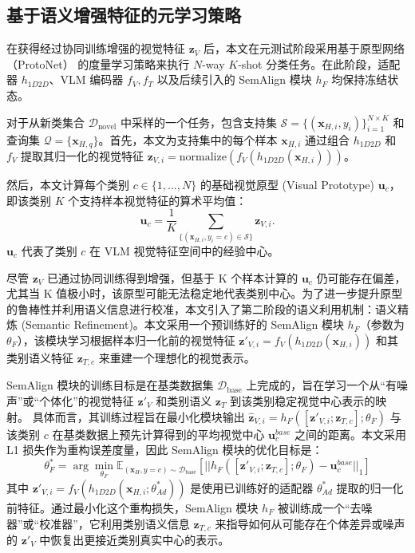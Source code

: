 \subsection{基于语义增强特征的元学习策略}
\label{subsec:semantic_fsl_strategy}

在获得经过协同训练增强的视觉特征 $\mathbf{z}_V$ 后，本文在元测试阶段采用基于原型网络（ProtoNet） 的度量学习策略来执行 $N$-way $K$-shot 分类任务。在此阶段，适配器 $h_{1D2D}$、VLM 编码器 $f_V, f_T$ 以及后续引入的 SemAlign 模块 $h_F$ 均保持冻结状态。

对于从新类集合 $\mathcal{D}_{\text{novel}}$ 中采样的一个任务，包含支持集 $\mathcal{S} = \{(\mathbf{x}_{H,i}, y_i)\}_{i=1}^{N \times K}$ 和查询集 $\mathcal{Q} = \{\mathbf{x}_{H,q}\}$。首先，本文为支持集中的每个样本 $\mathbf{x}_{H,i}$ 通过组合 $h_{1D2D}$ 和 $f_V$ 提取其归一化的视觉特征 $\mathbf{z}_{V,i} = \text{normalize}(f_V(h_{1D2D}(\mathbf{x}_{H,i})))$。

然后，本文计算每个类别 $c \in \{1, \dots, N\}$ 的基础视觉原型 (Visual Prototype) $\mathbf{u}_c$，即该类别 $K$ 个支持样本视觉特征的算术平均值：
\begin{equation} \mathbf{u}_c = \frac{1}{K} \sum_{\{(\mathbf{x}_{H,i}, y_i=c) \in \mathcal{S}\}} \mathbf{z}_{V,i}. \label{eq:visual_prototype} \end{equation}
$\mathbf{u}_c$ 代表了类别 $c$ 在 VLM 视觉特征空间中的经验中心。

尽管 $\mathbf{z}_V$ 已通过协同训练得到增强，但基于 K 个样本计算的 $\mathbf{u}_c$ 仍可能存在偏差，尤其当 K 值极小时，该原型可能无法稳定地代表类别中心。为了进一步提升原型的鲁棒性并利用语义信息进行校准，本文引入了第二阶段的语义利用机制：语义精炼 (Semantic Refinement)。本文采用一个预训练好的 SemAlign 模块 $h_F$（参数为 $\theta_F$），该模块学习根据样本归一化前的视觉特征 $\mathbf{z}'_{V,i} = f_V(h_{1D2D}(\mathbf{x}_{H,i}))$ 和其类别语义特征 $\mathbf{z}_{T,c}$ 来重建一个理想化的视觉表示。

SemAlign 模块的训练目标是在基类数据集 $\mathcal{D}_{\text{base}}$ 上完成的，旨在学习一个从“有噪声”或“个体化”的视觉特征 $\mathbf{z}'_V$ 和类别语义 $\mathbf{z}_T$ 到该类别稳定视觉中心表示的映射。 具体而言，其训练过程旨在最小化模块输出 $\hat{\mathbf{z}}_{V,i} = h_F([\mathbf{z}'_{V,i}; \mathbf{z}_{T,c}]; \theta_F)$ 与该类别 $c$ 在基类数据上预先计算得到的平均视觉中心 $\mathbf{u}_c^{base}$ 之间的距离。本文采用 L1 损失作为重构误差度量，因此 SemAlign 模块的优化目标是：
\begin{equation}
    \theta_F^* = \arg\min_{\theta_F} \mathbb{E}_{(\mathbf{x}_H, y=c) \sim \mathcal{D}_{\text{base}}} \left[ || h_F([\mathbf{z}'_{V,i}; \mathbf{z}_{T,c}]; \theta_F) - \mathbf{u}_c^{base} ||_1 \right]
    \label{eq:semalign_loss_detail}
\end{equation}
其中 $\mathbf{z}'_{V,i} = f_V(h_{1D2D}(\mathbf{x}_{H,i}; \theta_{Ad}^*))$ 是使用已训练好的适配器 $\theta_{Ad}^*$ 提取的归一化前特征。通过最小化这个重构损失，SemAlign 模块 $h_F$ 被训练成一个“去噪器”或“校准器”，它利用类别语义信息 $\mathbf{z}_{T,c}$ 来指导如何从可能存在个体差异或噪声的 $\mathbf{z}'_V$ 中恢复出更接近类别真实中心的表示。

